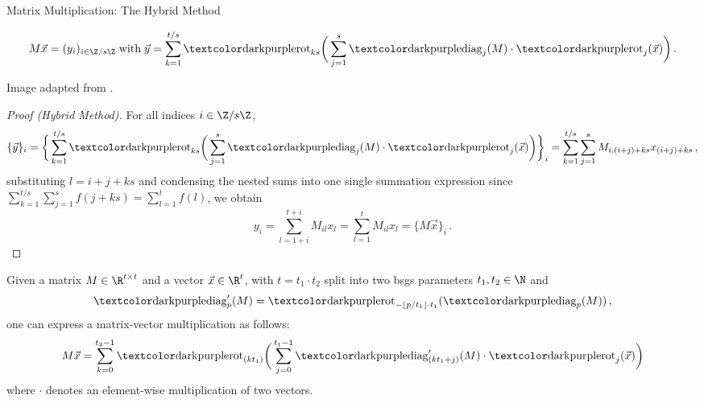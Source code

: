 \begin{frame}{Matrix Multiplication: The Hybrid Method}
  \begin{figure}[H]
    \centering
    \hspace{\matmulhoffset}
    \label{fig:hybrid-method}
  \end{figure}

  $$M \vec{x} = (y_i)_{i \in \Z/s\Z} \;\text{with}\; \vec{y} = \sum_{k=1}^{t / s} \rot_{ks}\bigg(\sum_{j=1}^s \diag_j(M) \cdot \rot_j(\vec{x})\bigg) \,.$$

  \begin{flushright}\tiny Image adapted from \cite{2020-cryptotree}.\end{flushright}
\end{frame}

\begin{frame}[c]
  \begin{proof}[Proof (Hybrid Method)]
    For all indices $i \in \Z/s\Z$,
    $$\{\vec{y}\}_i = \bigg\{\sum_{k=1}^{t / s} \rot_{ks}\bigg(\sum_{j=1}^s \diag_j(M) \cdot \rot_j(\vec{x})\bigg)\bigg\}_i = \sum_{k=1}^{t / s} \sum_{j=1}^{s} M_{i,(i+j) + ks} x_{(i+j) + ks} \,,$$
    substituting $l = i+j+ks$ and condensing the nested sums into one single summation expression since $\sum_{k=1}^{t / s} \sum_{j=1}^{s} f(j+ks) = \sum_{l=1}^{t} f(l)$, we obtain
    $$y_i = \sum_{l=1+i}^{t+i} M_{il} x_l = \sum_{l=1}^{t} M_{il} x_l = \{M \vec{x}\}_i \,.$$
  \end{proof}
\end{frame}

\begin{frame}[c]
  \begin{theorem}
    Given a matrix $M \in \R^{t \times t}$ and a vector $\vec{x} \in \R^t$, with $t = t_1 \cdot t_2$ split into two \gls{bsgs} parameters $t_1, t_2 \in \N$ and
    $$\diag'_p(M) = \rot_{-\lfloor p/t_1 \rfloor \cdot t_1}(\diag_p(M))\,,$$
    one can express a matrix-vector multiplication as follows:
    \begin{equation*}
      M \vec{x} = \sum_{k=0}^{t_2-1} \rot_{(kt_1)} \bigg(
      \sum_{j=0}^{t_1-1} \diag'_{(kt_1+j)}(M) \cdot \rot_j(\vec{x})
      \bigg)
    \end{equation*}
    where $\cdot$ denotes an element-wise multiplication of two vectors.
  \end{theorem}
\end{frame}


